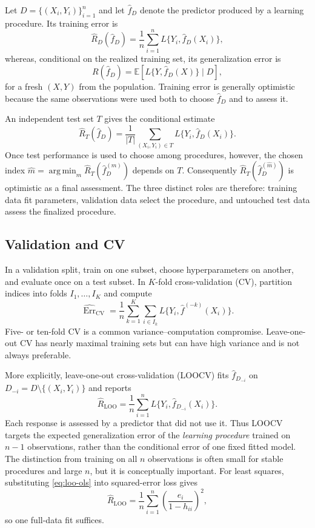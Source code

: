 \documentclass[12pt,oneside]{book}
\numberwithin{equation}{section}
\theoremstyle{definition}
\theoremstyle{plain}
\theoremstyle{remark}
\newcommand{\E}{\mathbb{E}}
\newcommand{\argmin}{\operatorname*{arg\,min}}
\begin{document}
Let $D=\{(X_i,Y_i)\}_{i=1}^n$ and let $\widehat f_D$ denote the predictor
produced by a learning procedure. Its training error is
\[
 \widehat R_D(\widehat f_D)
 =\frac1n\sum_{i=1}^n L\{Y_i,\widehat f_D(X_i)\},
\]
whereas, conditional on the realized training set, its generalization error is
\begin{equation}
 R(\widehat f_D)
 =\E\!\left[L\{Y,\widehat f_D(X)\}\mid D\right],
 \label{eq:conditional-generalization-error}
\end{equation}
for a fresh $(X,Y)$ from the population. Training error is generally
optimistic because the same observations were used both to choose
$\widehat f_D$ and to assess it.

An independent test set $T$ gives the conditional estimate
\[
 \widehat R_T(\widehat f_D)
 =\frac1{|T|}\sum_{(X_i,Y_i)\in T}L\{Y_i,\widehat f_D(X_i)\}.
\]
Once test performance is used to choose among procedures, however, the chosen
index $\widehat m=\argmin_m\widehat R_T(\widehat f_D^{(m)})$ depends on $T$.
Consequently $\widehat R_T(\widehat f_D^{(\widehat m)})$ is optimistic as a
final assessment. The three distinct roles are therefore: training data fit
parameters, validation data select the procedure, and untouched test data
assess the finalized procedure.

\subsection{Validation and CV}

In a validation split, train on one subset, choose hyperparameters on another,
and evaluate once on a test subset. In $K$-fold cross-validation (CV), partition
indices into folds $I_1,\ldots,I_K$ and compute
\[
 \widehat{\operatorname{Err}}_{\mathrm{CV}}
 =\frac1n\sum_{k=1}^K\sum_{i\in I_k}
 L\{Y_i,\widehat f^{(-k)}(X_i)\}.
\]
Five- or ten-fold CV is a common variance--computation compromise. Leave-one-
out CV has nearly maximal training sets but can have high variance and is not
always preferable.

More explicitly, leave-one-out cross-validation (LOOCV) fits
$\widehat f_{D_{-i}}$ on $D_{-i}=D\setminus\{(X_i,Y_i)\}$ and reports
\begin{equation}
 \widehat R_{\mathrm{LOO}}
 =\frac1n\sum_{i=1}^n
 L\{Y_i,\widehat f_{D_{-i}}(X_i)\}.
 \label{eq:loocv-error}
\end{equation}
Each response is assessed by a predictor that did not use it. Thus LOOCV
targets the expected generalization error of the \emph{learning procedure}
trained on $n-1$ observations, rather than the conditional error of one fixed
fitted model. The distinction from training on all $n$ observations is often
small for stable procedures and large $n$, but it is conceptually important.
For least squares, substituting \cref{eq:loo-ols} into squared-error loss gives
\[
 \widehat R_{\mathrm{LOO}}
 =\frac1n\sum_{i=1}^n\left(\frac{e_i}{1-h_{ii}}\right)^2,
\]
so one full-data fit suffices.
\end{document}
